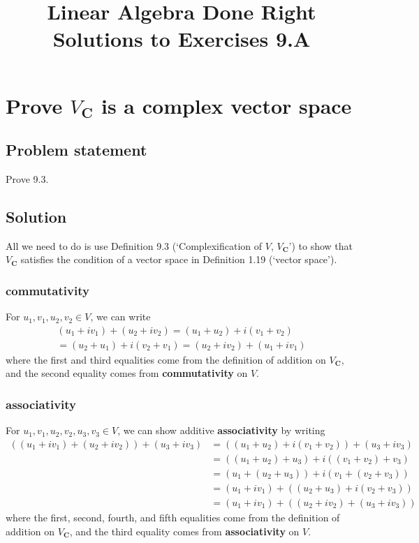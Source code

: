 \documentclass{article}
\title{Linear Algebra Done Right\\Solutions to Exercises 9.A}
\author{}
\date{}
\begin{document}
\maketitle

\section{Prove $V_{\mathbf{C}}$ is a complex vector space}
\subsection*{Problem statement}
Prove 9.3.

\subsection*{Solution}
All we need to do is use Definition 9.3 (`Complexification of $V$, $V_{\mathbf{C}}$') to show that $V_{\mathbf{C}}$ satisfies the condition of a vector space in Definition 1.19 (`vector space').

\subsubsection*{commutativity}
For $u_1,v_1,u_2,v_2\in V$, we can write
\begin{multline*}
(u_1+iv_1)+(u_2+iv_2)=(u_1+u_2)+i(v_1+v_2)\\
=(u_2+u_1)+i(v_2+v_1)=(u_2+iv_2)+(u_1+iv_1)
\end{multline*}
where the first and third equalities come from the definition of addition on $V_{\mathbf{C}}$, and the second equality comes from \textbf{commutativity} on $V$.

\subsubsection*{associativity}
For $u_1,v_1,u_2,v_2,u_3,v_3\in V$, we can show additive \textbf{associativity} by writing
\begin{align*}
    ((u_1+iv_1)+(u_2+iv_2))+(u_3+iv_3)&=((u_1+u_2)+i(v_1+v_2))+(u_3+iv_3)\\
    &=((u_1+u_2)+u_3)+i((v_1+v_2)+v_3)\\
    &=(u_1+(u_2+u_3))+i(v_1+(v_2+v_3))\\
    &=(u_1+iv_1)+((u_2+u_3)+i(v_2+v_3))\\
    &=(u_1+iv_1)+((u_2+iv_2)+(u_3+iv_3))
\end{align*}
where the first, second, fourth, and fifth equalities come from the definition of addition on $V_{\mathbf{C}}$, and the third equality comes from \textbf{associativity} on $V$.
\end{document}
